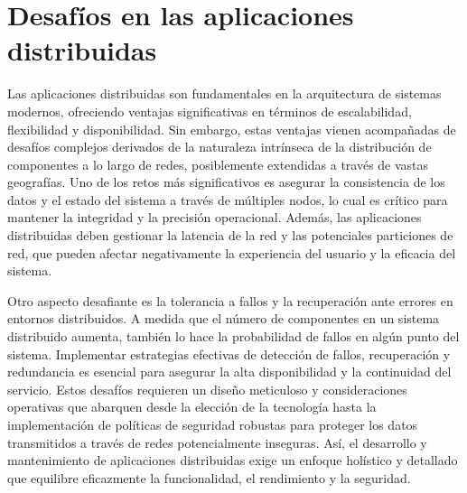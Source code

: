 \chapter{Desafíos en las aplicaciones distribuidas}
Las aplicaciones distribuidas son fundamentales en la arquitectura de sistemas modernos, ofreciendo ventajas significativas en términos de escalabilidad, flexibilidad y disponibilidad. Sin embargo, estas ventajas vienen acompañadas de desafíos complejos derivados de la naturaleza intrínseca de la distribución de componentes a lo largo de redes, posiblemente extendidas a través de vastas geografías. Uno de los retos más significativos es asegurar la consistencia de los datos y el estado del sistema a través de múltiples nodos, lo cual es crítico para mantener la integridad y la precisión operacional. Además, las aplicaciones distribuidas deben gestionar la latencia de la red y las potenciales particiones de red, que pueden afectar negativamente la experiencia del usuario y la eficacia del sistema.

Otro aspecto desafiante es la tolerancia a fallos y la recuperación ante errores en entornos distribuidos. A medida que el número de componentes en un sistema distribuido aumenta, también lo hace la probabilidad de fallos en algún punto del sistema. Implementar estrategias efectivas de detección de fallos, recuperación y redundancia es esencial para asegurar la alta disponibilidad y la continuidad del servicio. Estos desafíos requieren un diseño meticuloso y consideraciones operativas que abarquen desde la elección de la tecnología hasta la implementación de políticas de seguridad robustas para proteger los datos transmitidos a través de redes potencialmente inseguras. Así, el desarrollo y mantenimiento de aplicaciones distribuidas exige un enfoque holístico y detallado que equilibre eficazmente la funcionalidad, el rendimiento y la seguridad.

